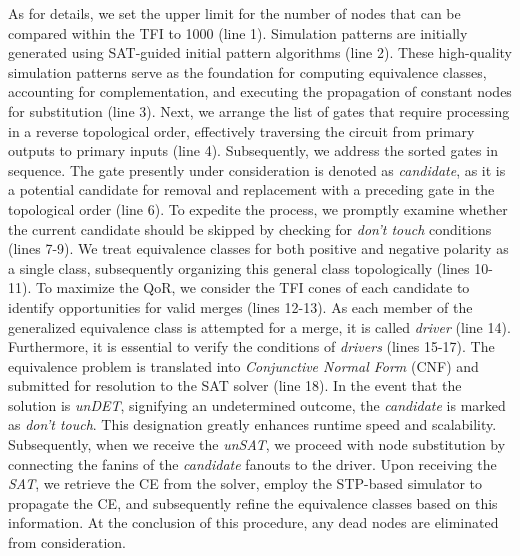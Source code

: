 \documentclass[conference]{IEEEtran}
\begin{document}
As for details, we set the upper limit for the number of nodes that can be compared within the TFI to 1000 (line 1). 
Simulation patterns are initially generated using SAT-guided initial pattern algorithms (line 2).
These high-quality simulation patterns serve as the foundation for computing equivalence classes, accounting for complementation, and executing the propagation of constant nodes for substitution (line 3).
Next, we arrange the list of gates that require processing in a reverse topological order, effectively traversing the circuit from primary outputs to primary inputs (line 4). 
Subsequently, we address the sorted gates in sequence. 
The gate presently under consideration is denoted as \emph{candidate}, as it is a potential candidate for removal and replacement with a preceding gate in the topological order (line 6).
To expedite the process, we promptly examine whether the current candidate should be skipped by checking for \emph{don't touch} conditions (lines 7-9). 
We treat equivalence classes for both positive and negative polarity as a single class, subsequently organizing this general class topologically (lines 10-11).
To maximize the QoR, we consider the TFI cones of each candidate to identify opportunities for valid merges (lines 12-13). 
As each member of the generalized equivalence class is attempted for a merge, it is called \emph{driver} (line 14).
Furthermore, it is essential to verify the conditions of \emph{drivers} (lines 15-17).
The equivalence problem is translated into \emph{Conjunctive Normal Form} (CNF) and submitted for resolution to the SAT solver (line 18). 
In the event that the solution is \emph{unDET}, signifying an undetermined outcome, the \emph{candidate} is marked as \emph{don't touch}.
This designation greatly enhances runtime speed and scalability. 
Subsequently, when we receive the \emph{unSAT}, we proceed with node substitution by connecting the fanins of the \emph{candidate} fanouts to the driver.
Upon receiving the \emph{SAT}, we retrieve the CE from the solver, employ the STP-based simulator to propagate the CE, and subsequently refine the equivalence classes based on this information. 
At the conclusion of this procedure, any dead nodes are eliminated from consideration.
\end{document}
